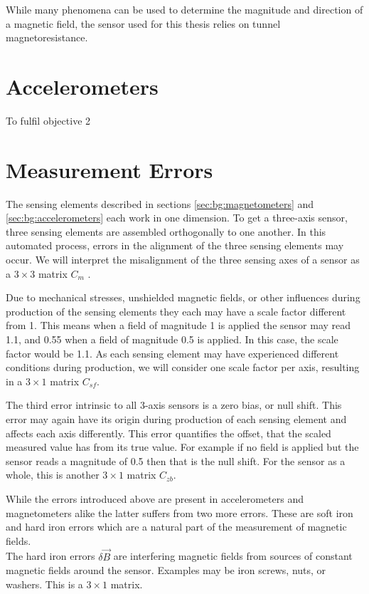 While many phenomena can be used to determine the magnitude and direction of a magnetic field, the sensor used for this thesis relies on tunnel magnetoresistance.

\section{Accelerometers \label{sec:bg:accelerometers}}
To fulfil objective 2

\section{Measurement Errors \label{sec:bg:measurement_errors}}
The sensing elements described in sections \ref{sec:bg:magnetometers} and \ref{sec:bg:accelerometers} each work in one dimension. To get a three-axis sensor, three sensing elements are assembled orthogonally to one another. In this automated process, errors in the alignment of the three sensing elements may occur. We will interpret the misalignment of the three sensing axes of a sensor as a $3\times3$ matrix $C_{m}$ \cite{magcal}\cite{non-orthonogality}.

Due to mechanical stresses, unshielded magnetic fields, or other influences during production of the sensing elements they each may have a scale factor different from 1. This means when a field of magnitude 1 is applied the sensor may read 1.1, and 0.55 when a field of magnitude 0.5 is applied. In this case, the scale factor would be 1.1. As each sensing element may have experienced different conditions during production, we will consider one scale factor per axis, resulting in a $3\times1$ matrix $C_{sf}$.

The third error intrinsic to all 3-axis sensors is a zero bias, or null shift. This error may again have its origin during production of each sensing element and affects each axis differently. This error quantifies the offset, that the scaled measured value has from its true value. For example if no field is applied but the sensor reads a magnitude of 0.5 then that is the null shift. For the sensor as a whole, this is another $3\times1$ matrix $C_{zb}$.

While the errors introduced above are present in accelerometers and magnetometers alike the latter suffers from two more errors. These are soft iron and hard iron errors which are a natural part of the measurement of magnetic fields.\\
The hard iron errors $\delta\vec{B}$ are interfering magnetic fields from sources of constant magnetic fields around the sensor. Examples may be iron screws, nuts, or washers. This is a $3\times1$ matrix.

